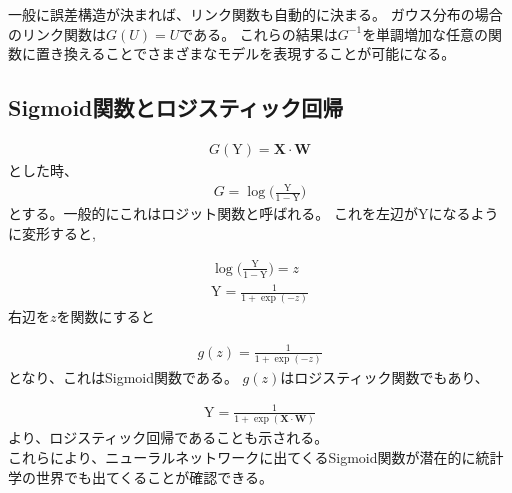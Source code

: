 一般に誤差構造が決まれば、リンク関数も自動的に決まる。
ガウス分布の場合のリンク関数は$ G(U) = U $である。
これらの結果は$ G^{-1} $を単調増加な任意の関数に置き換えることでさまざまなモデルを表現することが可能になる。


\subsection{Sigmoid関数とロジスティック回帰}
\label{history_sigmoid}
\begin{eqnarray}
G(\mathrm{Y})=\mathbf{X}\cdot  \mathbf{W}
\end{eqnarray}
とした時、
\begin{eqnarray}
G=\log \bigl(\frac{\mathrm{Y}}{1-\mathrm{Y}}\bigr)
\end{eqnarray}
とする。一般的にこれはロジット関数と呼ばれる。
これを左辺が$ \mathrm{Y} $になるように変形すると,

\begin{eqnarray}
\log \bigl(\frac{\mathrm{Y}}{1-\mathrm{Y}}\bigr) = z \\
\mathrm{Y} = \frac{1}{1 + \exp(-z)}
\end{eqnarray}
右辺を$ z $を関数にすると

\begin{eqnarray}
g(z) = \frac{1}{1 + \exp(-z)}
\end{eqnarray}
となり、これはSigmoid関数である。
$ g(z) $はロジスティック関数でもあり、


\begin{eqnarray}
\mathrm{Y} = \frac{1}{1 + \exp (\mathbf{X} \cdot  \mathbf{W})}
\end{eqnarray}
より、ロジスティック回帰であることも示される。 \\

これらにより、ニューラルネットワークに出てくるSigmoid関数が潜在的に統計学の世界でも出てくることが確認できる。






